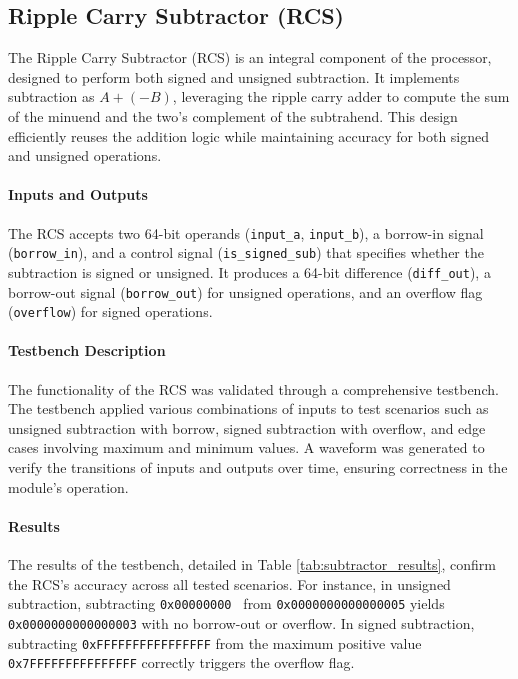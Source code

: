\documentclass[12pt]{article}
\begin{document}
\subsection*{Ripple Carry Subtractor (RCS)}

The Ripple Carry Subtractor (RCS) is an integral component of the processor, designed to perform both signed and unsigned subtraction. It implements subtraction as \( A + (-B) \), leveraging the ripple carry adder to compute the sum of the minuend and the two's complement of the subtrahend. This design efficiently reuses the addition logic while maintaining accuracy for both signed and unsigned operations.

\paragraph{Inputs and Outputs}
The RCS accepts two 64-bit operands (\texttt{input\_a}, \texttt{input\_b}), a borrow-in signal (\texttt{borrow\_in}), and a control signal (\texttt{is\_signed\_sub}) that specifies whether the subtraction is signed or unsigned. It produces a 64-bit difference (\texttt{diff\_out}), a borrow-out signal (\texttt{borrow\_out}) for unsigned operations, and an overflow flag (\texttt{overflow}) for signed operations.

\paragraph{Testbench Description}
The functionality of the RCS was validated through a comprehensive testbench. The testbench applied various combinations of inputs to test scenarios such as unsigned subtraction with borrow, signed subtraction with overflow, and edge cases involving maximum and minimum values. A waveform was generated to verify the transitions of inputs and outputs over time, ensuring correctness in the module's operation.

\paragraph{Results}
The results of the testbench, detailed in Table \ref{tab:subtractor_results}, confirm the RCS's accuracy across all tested scenarios. For instance, in unsigned subtraction, subtracting \texttt{0x00000000 } from \texttt{0x0000000000000005} yields \texttt{0x0000000000000003} with no borrow-out or overflow. In signed subtraction, subtracting \texttt{0xFFFFFFFFFFFFFFFF} from the maximum positive value \texttt{0x7FFFFFFFFFFFFFFF} correctly triggers the overflow flag.
\end{document}
